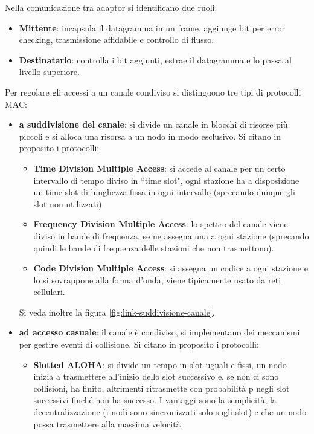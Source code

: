 \documentclass[11pt, italian, openany]{book}
\begin{document}
\begin{sloppypar}
Nella comunicazione tra adaptor si identificano due ruoli:
\begin{itemize}[itemsep=0pt,topsep=0pt,parsep=0pt]
	\item \textbf{Mittente}: incapsula il datagramma in un frame, aggiunge bit per error checking, trasmissione affidabile e controllo di flusso.
	\item \textbf{Destinatario}: controlla i bit aggiunti, estrae il datagramma e lo passa al livello superiore.
\end{itemize}

Per regolare gli accessi a un canale condiviso si distinguono tre tipi di protocolli MAC:
\begin{itemize}[itemsep=0pt,topsep=0pt,parsep=0pt]
	\item \textbf{a suddivisione del canale}: si divide un canale in blocchi di risorse pi\`u piccoli e si alloca una risorsa a un nodo in modo esclusivo.
	Si citano in proposito i protocolli:
	\begin{itemize}
		\item \textbf{Time Division Multiple Access}: si accede al canale per un certo intervallo di tempo diviso in ``time slot",
		ogni stazione ha a disposizione un time slot di lunghezza fissa in ogni intervallo (sprecando dunque gli slot non utilizzati).
		\item \textbf{Frequency Division Multiple Access}: lo spettro del canale viene diviso in bande di frequenza, se ne assegna una a ogni stazione
		(sprecando quindi le bande di frequenza delle stazioni che non trasmettono).
		\item \textbf{Code Division Multiple Access}: si assegna un codice a ogni stazione e lo si sovrappone alla forma d'onda, viene tipicamente usato
		da reti cellulari.
	\end{itemize}
	Si veda inoltre la figura \ref{fig:link-suddivisione-canale}.
	\item \textbf{ad accesso casuale}: il canale \`e condiviso, si implementano dei meccanismi per gestire eventi di collisione. Si citano in proposito
	i protocolli:
	\begin{itemize}
		\item \textbf{Slotted ALOHA}: si divide un tempo in slot uguali e fissi, un nodo inizia a trasmettere all'inizio dello slot successivo e,
		se non ci sono collisioni, ha finito, altrimenti ritrasmette con probabilit\`a p negli slot successivi finch\'e non ha successo. I vantaggi sono
		la semplicit\`a, la decentralizzazione (i nodi sono sincronizzati solo sugli slot) e che un nodo possa trasmettere alla massima velocit\`a

\end{itemize}
\end{itemize}
\end{sloppypar}
\end{document}

